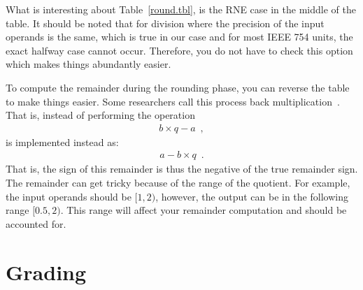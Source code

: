 \documentclass[times, 10pt, twocolumn]{IEEEtran}
\begin{document}
What is interesting about Table~\ref{round.tbl}, is the RNE case in
the middle of the table.
It should be noted that for division where the precision of the
input operands is the same, which is true in our case and for most
IEEE 754 units, the exact halfway
case cannot occur.  Therefore, you do not have to check this option
which makes things abundantly easier.

To compute the remainder during the rounding phase, you can reverse
the table to make things easier.  Some researchers call this process
back multiplication~\cite{762835}.  That is, instead of performing the operation
\begin{eqnarray*}
  b \times q - a \enspace ,
\end{eqnarray*}
is implemented instead as:
\begin{eqnarray*}
  a - b \times q \enspace .
\end{eqnarray*}
That is, the sign of this remainder is thus the negative of the true
remainder sign.  The remainder can get tricky because of the range of
the quotient.  For example, the input operands should be $[1,2)$,
however, the output can be in the following range $[0.5, 2)$.  This
range will affect your remainder computation and should be
accounted for.  




\section{Grading}
\end{document}

